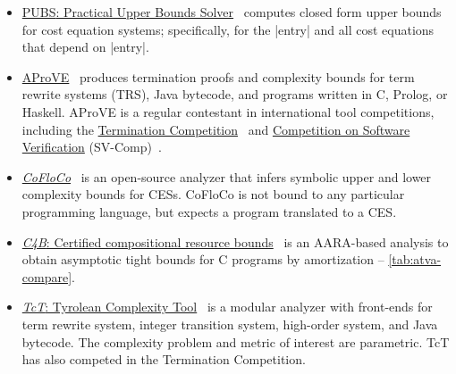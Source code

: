 \begin{itemize}

\item \href{https://costa.fdi.ucm.es/~costa/pubs/pubs.php}{{PUBS}: Practical Upper Bounds Solver}~\cite{albert2010}
      computes closed form upper bounds for cost equation systems;
      specifically, for the \pr|entry| and all cost equations that depend on \pr|entry|.

\item \href{https://aprove.informatik.rwth-aachen.de}{{AProVE}}~\cite{giesl2017}
      produces termination proofs and complexity bounds for
      term rewrite systems (TRS),
      Java bytecode,
      and programs written in
      C,
      Prolog, or
      Haskell.
      AProVE is a regular contestant in international tool competitions, including the
      \href{https://termination-portal.org/wiki/Termination_Competition}{Termination Competition}~\cite{giesl2019}
      and \href{https://sv-comp.sosy-lab.org/}{Competition on Software Verification} (SV-Comp)~\cite{beyer2022}.

\item \href{https://github.com/aeflores/CoFloCo}{\emph{CoFloCo}}~\cite{floresmontoya2014}
      is an open-source analyzer that infers symbolic upper and lower complexity bounds for CESs.
      CoFloCo is not bound to any particular programming language, but expects a program translated to a CES.

\item \href{https://www.cs.yale.edu/homes/qcar/aaa/}{\emph{C4B}:
      Certified compositional resource bounds}~\cite{carbonneaux2015}
      is an AARA-based analysis to obtain asymptotic tight bounds for C programs
      by amortization -- \autoref{tab:atva-compare}.

\item  \href{http://cl-informatik.uibk.ac.at/software/tct/}{\emph{TcT}: Tyrolean Complexity Tool}~\cite{avanzini2016}
       is a modular analyzer with front-ends for term rewrite system, integer transition system, high-order system, and Java bytecode.
       The complexity problem and metric of interest are parametric.
       TcT has also competed in the Termination Competition.


\end{itemize}
